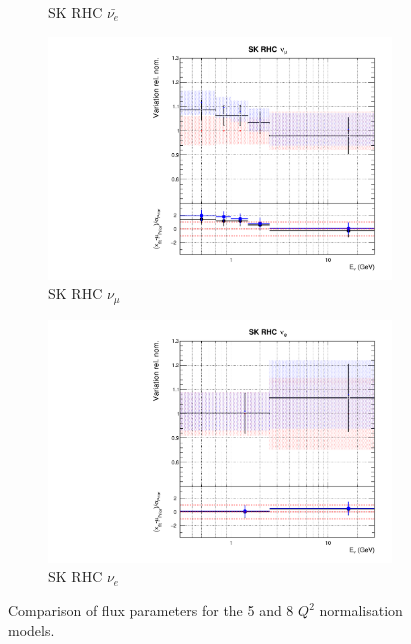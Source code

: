 \begin{figure}
\begin{subfigure}{0.24\textwidth}
  \caption{SK RHC $\bar{\nu_e}$}
\end{subfigure}
\begin{subfigure}{0.24\textwidth}
  \centering
  \includegraphics[width=0.95\linewidth]{figs/comp5q2vs8q2flux14}
  \caption{SK RHC $\nu_{\mu}$}
\end{subfigure}
\begin{subfigure}{0.24\textwidth}
  \centering
  \includegraphics[width=0.95\linewidth]{figs/comp5q2vs8q2flux15}
  \caption{SK RHC $\nu_e$}
\end{subfigure}
\caption{Comparison of flux parameters for the 5 and 8 $Q^2$ normalisation models.}
\label{fig:comp5q2vs8q2flux}
\end{figure}

